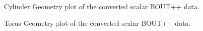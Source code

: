 \documentclass[12pt,a4paper]{article}
\begin{document}
\begin{figure}[H]
	\centering
	\caption{Cylinder Geometry plot of the converted scalar BOUT++ data.}
	\label{fig:cylinder_scalar}
\end{figure}

\begin{figure}[H]
	\centering
	\caption{Torus Geometry plot of the converted scalar BOUT++ data.}
	\label{fig:torus_scalar}
\end{figure}
\end{document}
